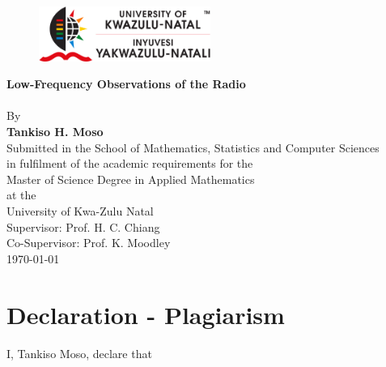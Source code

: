 \documentclass[12pt,a4paper]{report}
\begin{document}
	\begin{titlepage}
		
		\newcommand{\HRule}{\rule{\linewidth}{0.5mm}} %
		
		\begin{center}
		\begin{figure}[ht]
			\centering
				\includegraphics[width=0.5\textwidth]{Figures/UKZNLOGO.png}\\[1cm]
		\end{figure}
		
		\LARGE {\textbf {Low-Frequency Observations of the Radio\\[0.3cm Sky from Marion Island]}}\\[1cm]
	    {By}\\[0.5cm]
		\textbf {\Large {Tankiso H. Moso}}\\[0.5cm]
		{\small Submitted in the School of Mathematics, Statistics and Computer Sciences\\in  fulfilment of the academic requirements for the\\Master of Science Degree in Applied Mathematics\\at the\\University of Kwa-Zulu Natal}\\[1cm]
		
		{\large Supervisor: Prof. H. C. Chiang}\\[0.1cm]
		{\large Co-Supervisor: Prof. K. Moodley}\\[3cm]
		
		{\large \today}\\[0cm] %
		\end{center}	
	\end{titlepage}


\section*{Declaration - Plagiarism}

I, Tankiso Moso, declare that
\end{document}
